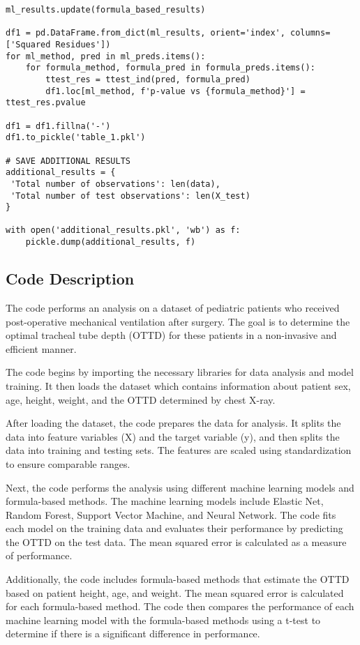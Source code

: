 \documentclass[11pt]{article}
\begin{document}
\begin{verbatim}
ml_results.update(formula_based_results)

df1 = pd.DataFrame.from_dict(ml_results, orient='index', columns=['Squared Residues'])
for ml_method, pred in ml_preds.items():
    for formula_method, formula_pred in formula_preds.items():
        ttest_res = ttest_ind(pred, formula_pred)
        df1.loc[ml_method, f'p-value vs {formula_method}'] = ttest_res.pvalue

df1 = df1.fillna('-')
df1.to_pickle('table_1.pkl')

# SAVE ADDITIONAL RESULTS
additional_results = {
 'Total number of observations': len(data), 
 'Total number of test observations': len(X_test)
}

with open('additional_results.pkl', 'wb') as f:
    pickle.dump(additional_results, f)

\end{verbatim}

\subsection{Code Description}

The code performs an analysis on a dataset of pediatric patients who received post-operative mechanical ventilation after surgery. The goal is to determine the optimal tracheal tube depth (OTTD) for these patients in a non-invasive and efficient manner.

The code begins by importing the necessary libraries for data analysis and model training. It then loads the dataset which contains information about patient sex, age, height, weight, and the OTTD determined by chest X-ray.

After loading the dataset, the code prepares the data for analysis. It splits the data into feature variables (X) and the target variable (y), and then splits the data into training and testing sets. The features are scaled using standardization to ensure comparable ranges.

Next, the code performs the analysis using different machine learning models and formula-based methods. The machine learning models include Elastic Net, Random Forest, Support Vector Machine, and Neural Network. The code fits each model on the training data and evaluates their performance by predicting the OTTD on the test data. The mean squared error is calculated as a measure of performance. 

Additionally, the code includes formula-based methods that estimate the OTTD based on patient height, age, and weight. The mean squared error is calculated for each formula-based method. The code then compares the performance of each machine learning model with the formula-based methods using a t-test to determine if there is a significant difference in performance.
\end{document}
